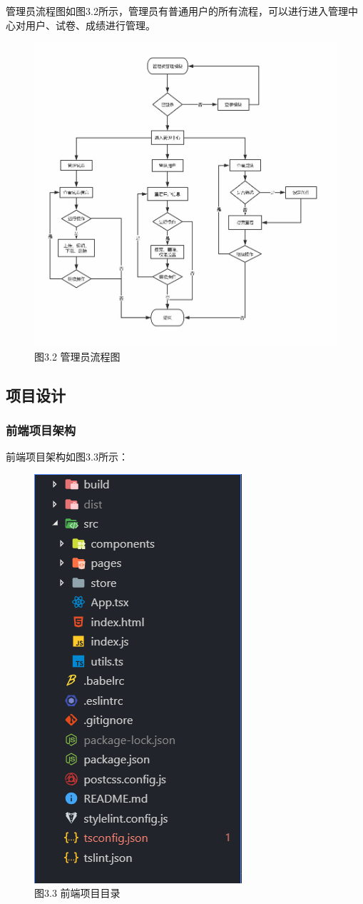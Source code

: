 管理员流程图如图3.2所示，管理员有普通用户的所有流程，可以进行进入管理中心对用户、试卷、成绩进行管理。

\begin{figure}[thbp!]
	\centering
	\includegraphics[width=1.0\linewidth]{figure/admin_use}
	\label{fig:admin_use} \\
		图3.2 管理员流程图
\end{figure}

\subsection{项目设计}

\subsubsection{前端项目架构}

前端项目架构如图3.3所示：

\begin{figure}[thbp!]
	\centering
	\includegraphics[width=0.3\linewidth]{figure/frontend_structure}
	\label{fig:frontend_structure} \\
		图3.3 前端项目目录
\end{figure}

